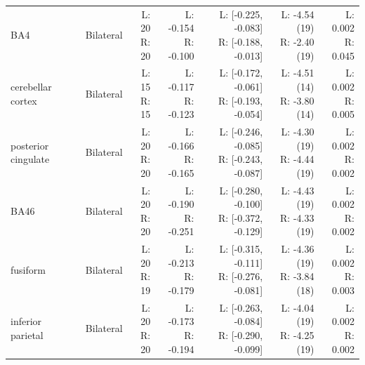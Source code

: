 \begin{longtable}{@{}llrrrrr@{}}
BA4 & Bilateral & \shortstack[r]{L: 20\\R: 20} & \shortstack[r]{L: -0.154\\R: -0.100} & \shortstack[r]{L: [-0.225, -0.083]\\R: [-0.188, -0.013]} & \shortstack[r]{L: -4.54 (19)\\R: -2.40 (19)} & \shortstack[r]{L: 0.002\\R: 0.045} \\*
cerebellar cortex & Bilateral & \shortstack[r]{L: 15\\R: 15} & \shortstack[r]{L: -0.117\\R: -0.123} & \shortstack[r]{L: [-0.172, -0.061]\\R: [-0.193, -0.054]} & \shortstack[r]{L: -4.51 (14)\\R: -3.80 (14)} & \shortstack[r]{L: 0.002\\R: 0.005} \\*
posterior cingulate & Bilateral & \shortstack[r]{L: 20\\R: 20} & \shortstack[r]{L: -0.166\\R: -0.165} & \shortstack[r]{L: [-0.246, -0.085]\\R: [-0.243, -0.087]} & \shortstack[r]{L: -4.30 (19)\\R: -4.44 (19)} & \shortstack[r]{L: 0.002\\R: 0.002} \\*
BA46 & Bilateral & \shortstack[r]{L: 20\\R: 20} & \shortstack[r]{L: -0.190\\R: -0.251} & \shortstack[r]{L: [-0.280, -0.100]\\R: [-0.372, -0.129]} & \shortstack[r]{L: -4.43 (19)\\R: -4.33 (19)} & \shortstack[r]{L: 0.002\\R: 0.002} \\*
fusiform & Bilateral & \shortstack[r]{L: 20\\R: 19} & \shortstack[r]{L: -0.213\\R: -0.179} & \shortstack[r]{L: [-0.315, -0.111]\\R: [-0.276, -0.081]} & \shortstack[r]{L: -4.36 (19)\\R: -3.84 (18)} & \shortstack[r]{L: 0.002\\R: 0.003} \\*
inferior parietal & Bilateral & \shortstack[r]{L: 20\\R: 20} & \shortstack[r]{L: -0.173\\R: -0.194} & \shortstack[r]{L: [-0.263, -0.084]\\R: [-0.290, -0.099]} & \shortstack[r]{L: -4.04 (19)\\R: -4.25 (19)} & \shortstack[r]{L: 0.002\\R: 0.002} \\*

\end{longtable}
